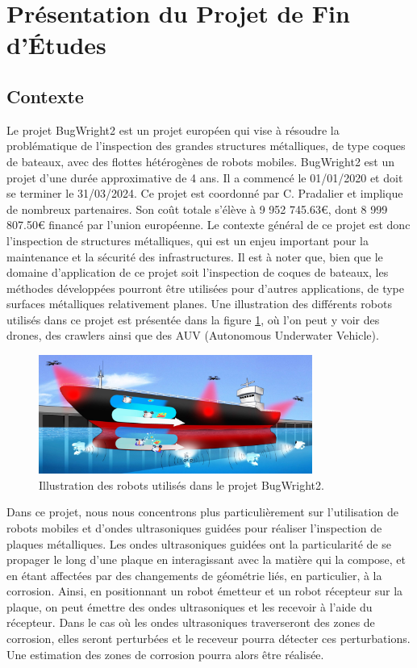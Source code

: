 \documentclass[init,francais,RandD]{rapportPFE}
\begin{document}
	\section{Présentation du Projet de Fin d'Études}
		\subsection{Contexte}
			Le projet BugWright2 est un projet européen qui vise à résoudre la problématique de l'inspection des grandes structures métalliques, de type coques de bateaux, avec des flottes hétérogènes de robots mobiles. BugWright2 est un projet d'une durée approximative de 4 ans. Il a commencé le 01/01/2020 et doit se terminer le 31/03/2024. Ce projet est coordonné par C. Pradalier et implique de nombreux partenaires. Son coût totale s'élève à 9 952 745.63\euro{}, dont 8 999 807.50\euro{} financé par l'union européenne. Le contexte général de ce projet est donc l'inspection de structures métalliques, qui est un enjeu important pour la maintenance et la sécurité des infrastructures. Il est à noter que, bien que le domaine d'application de ce projet soit l'inspection de coques de bateaux, les méthodes développées pourront être utilisées pour d'autres applications, de type surfaces métalliques relativement planes. Une illustration des différents robots utilisés dans ce projet est présentée dans la figure \ref{fig:cartoon}, où l'on peut y voir des drones, des crawlers ainsi que des AUV (Autonomous Underwater Vehicle).

			\begin{figure}[h]
				\centering
				\includegraphics[width=0.8\textwidth]{graphics/Concept-Cartoon-NJ3-e1582812224528.jpg}
				\caption{Illustration des robots utilisés dans le projet BugWright2.}
				\label{fig:cartoon}
			\end{figure}

			Dans ce projet, nous nous concentrons plus particulièrement sur l'utilisation de robots mobiles et d'ondes ultrasoniques guidées pour réaliser l'inspection de plaques métalliques. Les ondes ultrasoniques guidées ont la particularité de se propager le long d'une plaque en interagissant avec la matière qui la compose, et en étant affectées par des changements de géométrie liés, en particulier, à la corrosion. Ainsi, en positionnant un robot émetteur et un robot récepteur sur la plaque, on peut émettre des ondes ultrasoniques et les recevoir à l'aide du récepteur. Dans le cas où les ondes ultrasoniques traverseront des zones de corrosion, elles seront perturbées et le receveur pourra détecter ces perturbations. Une estimation des zones de corrosion pourra alors être réalisée.
\end{document}

